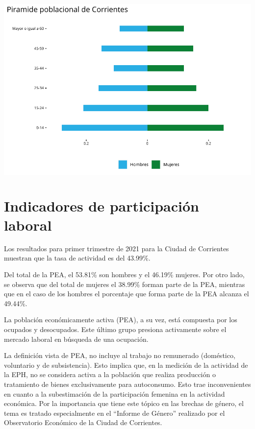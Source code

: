 \documentclass[
]{article}
\begin{document}
\includegraphics{Informe-Mercado-Laboral_files/figure-latex/unnamed-chunk-7-1.pdf}

\newpage

\hypertarget{indicadores-de-participaciuxf3n-laboral}{%
\section{Indicadores de participación
laboral}\label{indicadores-de-participaciuxf3n-laboral}}

Los resultados para primer trimestre de 2021 para la Ciudad de
Corrientes muestran que la tasa de actividad es del 43.99\%.

Del total de la PEA, el 53.81\% son hombres y el 46.19\% mujeres. Por
otro lado, se observa que del total de mujeres el 38.99\% forman parte
de la PEA, mientras que en el caso de los hombres el porcentaje que
forma parte de la PEA alcanza el 49.44\%.

La población económicamente activa (PEA), a su vez, está compuesta por
los ocupados y desocupados. Este último grupo presiona activamente sobre
el mercado laboral en búsqueda de una ocupación.

La definición vista de PEA, no incluye al trabajo no remunerado
(doméstico, voluntario y de subsistencia). Esto implica que, en la
medición de la actividad de la EPH, no se considera activa a la
población que realiza producción o tratamiento de bienes exclusivamente
para autoconsumo. Esto trae inconvenientes en cuanto a la subestimación
de la participación femenina en la actividad económica. Por la
importancia que tiene este tópico en las brechas de género, el tema es
tratado especialmente en el ``Informe de Género'' realizado por el
Observatorio Económico de la Ciudad de Corrientes.
\end{document}
